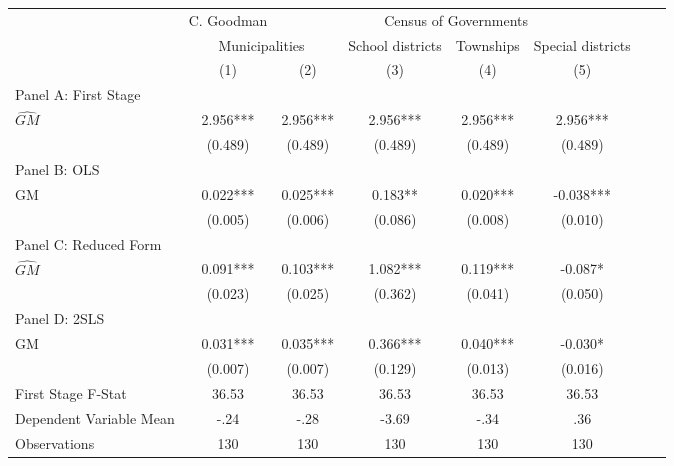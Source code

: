    \begin{tabular}{l*{7}{c}} \toprule
&\multicolumn{1}{c}{C. Goodman}&\multicolumn{4}{c}{Census of Governments}\\\cmidrule(lr){2-2}\cmidrule(lr){3-6}
&\multicolumn{2}{c}{Municipalities}&\multicolumn{1}{c}{School districts}&\multicolumn{1}{c}{Townships}&\multicolumn{1}{c}{Special districts}\\\cmidrule(lr){2-3}\cmidrule(lr){4-6}
&\multicolumn{1}{c}{(1)}&\multicolumn{1}{c}{(2)}&\multicolumn{1}{c}{(3)}&\multicolumn{1}{c}{(4)}&\multicolumn{1}{c}{(5)}\\
\cmidrule(lr){1-6}
\multicolumn{5}{l}{Panel A: First Stage}\\
\cmidrule(lr){1-6}
$\widehat{GM}$  &    2.956***&    2.956***&    2.956***&    2.956***&    2.956***\\
                &  (0.489)   &  (0.489)   &  (0.489)   &  (0.489)   &  (0.489)   \\
\cmidrule(lr){1-6}
\multicolumn{5}{l}{Panel B: OLS}\\
\cmidrule(lr){1-6}
GM              &    0.022***&    0.025***&    0.183** &    0.020***&   -0.038***\\
                &  (0.005)   &  (0.006)   &  (0.086)   &  (0.008)   &  (0.010)   \\
\cmidrule(lr){1-6}
\multicolumn{5}{l}{Panel C: Reduced Form}\\
\cmidrule(lr){1-6}
$\widehat{GM}$  &    0.091***&    0.103***&    1.082***&    0.119***&   -0.087*  \\
                &  (0.023)   &  (0.025)   &  (0.362)   &  (0.041)   &  (0.050)   \\
\cmidrule(lr){1-6}
\multicolumn{5}{l}{Panel D: 2SLS}\\
\cmidrule(lr){1-6}
GM              &    0.031***&    0.035***&    0.366***&    0.040***&   -0.030*  \\
                &  (0.007)   &  (0.007)   &  (0.129)   &  (0.013)   &  (0.016)   \\
\midrule
First Stage F-Stat&    36.53   &    36.53   &    36.53   &    36.53   &    36.53   \\
Dependent Variable Mean&     -.24   &     -.28   &    -3.69   &     -.34   &      .36   \\
Observations    &      130   &      130   &      130   &      130   &      130   \\
       \bottomrule \end{tabular}
